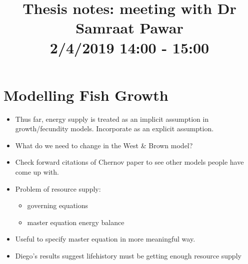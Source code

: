 \documentclass[11pt]{article}
\title{Thesis notes: meeting with Dr Samraat Pawar \\ 2/4/2019 14:00 - 15:00}
\date{}
\begin{document}
    \maketitle
    
    \section*{Modelling Fish Growth}
        \begin{itemize}
            \item Thus far, energy supply is treated as an implicit assumption in growth/fecundity models. Incorporate as an explicit assumption.
            \item What do we need to change in the West \& Brown model?
            \item Check forward citations of Chernov paper to see other models people have come up with.
            \item Problem of resource supply:
                \begin{itemize}
                    \item governing equations
                    \item master equation energy balance
                \end{itemize}
            \item Useful to specify master equation in more meaningful way.
            \item Diego's results suggest lifehistory must be getting enough resource supply 
        \end{itemize}
\end{document}
